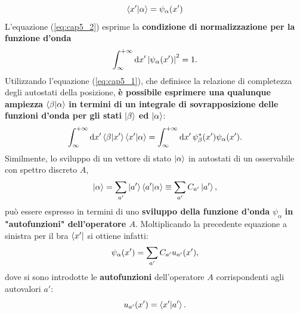 \documentclass[a4paper,12pt,oneside]{book}
\begin{document}
\begin{equation}
  \braket{x'}{\alpha} = \psi_{\alpha}\qty(x')
\end{equation}
L'equazione (\ref{eq:cap5_2}) esprime la \textbf{condizione di normalizzazione per la funzione d'onda}
\begin{equation}
  \int_{\infty}^{+\infty}\dd{x'}\abs{\psi_{\alpha}\qty(x')}^2=1 .
\end{equation}
Utilizzando l'equazione (\ref{eq:cap5_1}), che definisce la relazione di completezza degli autostati della posizione, \textbf{è possibile esprimere una qualunque ampiezza} $\braket{\beta}{\alpha}$ \textbf{in termini di un integrale di sovrapposizione delle funzioni d'onda per gli stati} $\ket{\beta}$ \textbf{ed} $\ket{\alpha}$:
\begin{equation}
  \int_{\infty}^{+\infty}\dd{x'}\braket{\beta}{x'}\braket{x'}{\alpha} = \int_{\infty}^{+\infty}\dd{x'} \psi^*_{\beta}\qty(x')\psi_{\alpha}\qty(x') .
\end{equation}
Similmente, lo sviluppo di un vettore di stato $\ket{\alpha}$ in autostati di un osservabile con spettro discreto $A$,
\begin{equation}
  \ket{\alpha} = \sum_{a'}\ket{a'}\braket{a'}{\alpha}\equiv \sum_{a'}C_{a'}\ket{a'} ,
\end{equation}
può essere espresso in termini di uno \textbf{sviluppo della funzione d'onda} $\psi_{\alpha}$ \textbf{in "autofunzioni" dell'operatore $A$}.
Moltiplicando la precedente equazione a sinistra per il bra $\bra{x'}$ si ottiene infatti:
\begin{equation}
  \psi_{\alpha}\qty(x') = \sum_{a'}C_{a'}u_{a'}\qty(x') ,
\end{equation}
dove si sono introdotte le \textbf{autofunzioni} dell'operatore $A$ corrispondenti agli autovalori $a'$:
\begin{equation}
  u_{a'}\qty(x') = \braket{x'}{a'} .
\end{equation}
\end{document}
